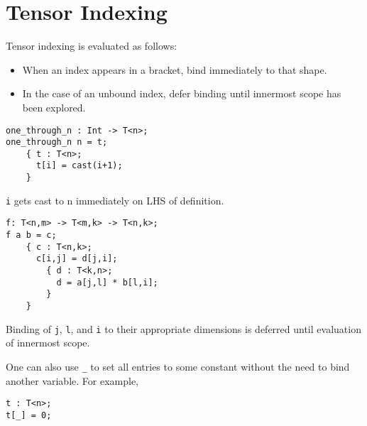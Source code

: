 \section{Tensor Indexing}%
\label{sec:tensor_indexing}
Tensor indexing is evaluated as follows:
\begin{itemize}
    \item When an index appears in a bracket, bind immediately to that shape.
    \item In the case of an unbound index, defer binding until 
        innermost scope has been explored.
\end{itemize}

\begin{lstlisting}[title={Fill a rank 1 tensor with entries 1 to n}]
one_through_n : Int -> T<n>;
one_through_n n = t; 
    { t : T<n>; 
      t[i] = cast(i+1);
    }
\end{lstlisting}
\verb|i| gets cast to n immediately on LHS of definition.

\begin{lstlisting}[title={Transpose of a Product}]
f: T<n,m> -> T<m,k> -> T<n,k>;
f a b = c; 
    { c : T<n,k>;
      c[i,j] = d[j,i];
        { d : T<k,n>;
          d = a[j,l] * b[l,i];
        }
    } 
\end{lstlisting}
Binding of \verb|j|, \verb|l|, and \verb|i| to their appropriate 
dimensions is deferred until evaluation of innermost scope. 
\par One can also use \verb|_| to set all entries to some 
constant without the need to bind another variable. For example,
\begin{lstlisting}
t : T<n>;
t[_] = 0;
\end{lstlisting}
